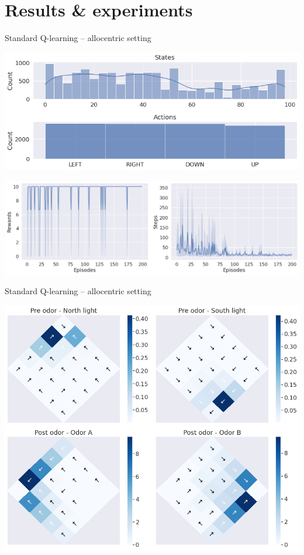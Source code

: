 \documentclass[bigger]{beamer}
\begin{document}
\section{Results \& experiments}
\label{sec:org2801ddb}
\begin{frame}[label={sec:org15ddb8b}]{Standard Q-learning -- allocentric setting}
\begin{center}
\includegraphics[height=0.4\textheight]{img/q-learning_allo_hist.png}
\end{center}
\begin{center}
\includegraphics[height=0.4\textheight]{img/q-learning_allo_steps_rewards.png}
\end{center}
\end{frame}
\begin{frame}[label={sec:org45203f9}]{Standard Q-learning -- allocentric setting}
\begin{center}
\includegraphics[width=.9\linewidth]{img/q-learning_allo_best_actions_maps.png}
\end{center}
\end{frame}
\end{document}
